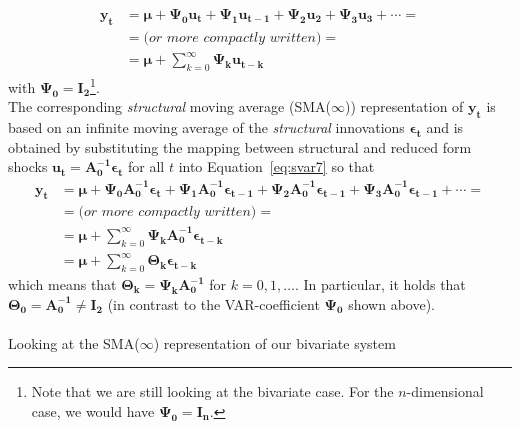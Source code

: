\documentclass[a4paper,11pt,listof=nochaptergap,oneside,pointednumbers,bibtotoc,bigheadings,liststotoc]{scrbook}
\newcommand{\vect}[1]{\boldsymbol{\mathbf{#1}}}
\begin{document}
\begin{equation} \label{eq:svar7}
\begin{split}
 			\vect{y_t} & = \vect{\mu} + \vect{\Psi_0}\vect{u_t} + \vect{\Psi_1}\vect{u_{t-1}} + \vect{\Psi_{2}}\vect{u_2} + \vect{\Psi_{3}}\vect{u_3} + \cdots = \\
			& = \textit{(or more compactly written)} = \\
			& = \vect{\mu} + \sum\limits_{k=0}^\infty \vect{\Psi_k}\vect{u_{t-k}}
\end{split}								
\end{equation}
with $\vect{\Psi_0} =\vect{\mathbf{I_2}}$\footnote{Note that we are still looking at the bivariate case. For the $n$-dimensional case, we would have $\vect{\Psi_0} =\vect{\mathbf{I_n}}$.}. \\
The corresponding \textit{structural} moving average (SMA($\infty$)) representation of $\vect{y_t}$ is based on an infinite moving average of the \textit{structural} innovations $\vect{\epsilon_t}$ and is obtained by substituting the mapping between structural and reduced form shocks $\vect{u_t} = \vect{A_0^{-1}}\vect{\epsilon_t}$ for all $t$ into Equation~\ref{eq:svar7} so that
\begin{equation} \label{eq:svar8}
\begin{split}
 			\vect{y_t} & = \vect{\mu} + \vect{\Psi_0}\vect{A_0^{-1}}\vect{\epsilon_t} + \vect{\Psi_1}\vect{A_0^{-1}}\vect{\epsilon_{t-1}} + \vect{\Psi_{2}}\vect{A_0^{-1}}\vect{\epsilon_{t-1}} + \vect{\Psi_{3}}\vect{A_0^{-1}}\vect{\epsilon_{t-1}} + \cdots = \\
			& = \textit{(or more compactly written)} = \\
			& = \vect{\mu} + \sum\limits_{k=0}^\infty \vect{\Psi_k}\vect{A_0^{-1}}\vect{\epsilon_{t-k}} \\
			& = \vect{\mu} + \sum\limits_{k=0}^\infty \vect{\Theta_k}\vect{\epsilon_{t-k}}
\end{split}								
\end{equation}
which means that $\vect{\Theta_k} = \vect{\Psi_k}\vect{A_0^{-1}}$ for $k = 0, 1, \dots$. In particular, it holds that $\vect{\Theta_0}=\vect{A_0^{-1}} \neq \vect{I_2}$ (in contrast to the VAR-coefficient $\vect{\Psi_0}$ shown above). \\
\\
Looking at the SMA($\infty$) representation of our bivariate system 
\end{document}
